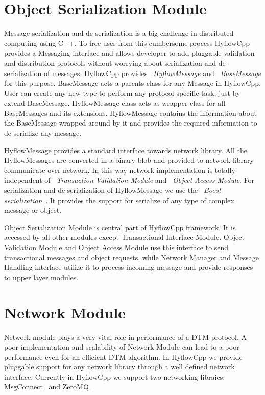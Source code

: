 \documentclass[12pt,english]{report}
\begin{document}
\section{Object Serialization Module}

Message serialization and de-serialization is a big challenge in distributed computing using C++. To free user from this cumbersome process HyflowCpp provides a Messaging interface and allows developer to add pluggable validation and distribution protocols without worrying about serialization and de-serialization of messages. HyflowCpp provides ~\emph{HyflowMessage} and ~\emph{BaseMessage} for this purpose. BaseMessage acts a parents class for any Message in HyflowCpp. User can create any new type to perform any protocol specific task, just by extend BaseMessage. HyflowMessage class acts as wrapper class for all BaseMessages and its extensions. HyflowMessage contains the information about the BaseMessage wrapped around by it and provides the required information to de-serialize any message.

HyflowMessage provides a standard interface towards network library. All the HyflowMessages are converted in a binary blob and provided to network library communicate over network. In this way network implementation is totally independent of ~\emph{Transaction Validation Module} and ~\emph{Object Access Module}. For serialization and de-serialization of HyflowMessage we use the ~\emph{Boost serialization}~\cite{karlsson2005beyond}. It provides the support for serialize of any type of complex message or object.  

Object Serialization Module is central part of HyflowCpp framework. It is accessed by all other modules except Transactional Interface Module. Object Validation Module and Object Access Module use this interface to send transactional messages and object requests, while Network Manager and Message Handling interface utilize it to process incoming message and provide responses to upper layer modules.

\section{Network Module}

Network module plays a very vital role in performance of a DTM protocol. A poor implementation and scalability of Network Module can lead to a poor performance even for an efficient DTM algorithm. In HyflowCpp we provide pluggable support for any network library through a well defined network interface. Currently in HyflowCpp we support two networking libraies: MsgConnect~\cite{MsgConnect:2012} and ZeroMQ~\cite{hintjens2011omq}.  
\end{document}
